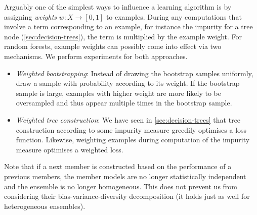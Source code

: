\documentclass[../main.tex]{subfiles}
\begin{document}
Arguably one of the simplest ways to influence a learning algorithm is by assigning \textit{weights} $w: X \to [0,1]$ to examples. During any computations that involve a term corresponding to an example, for instance the impurity for a tree node (\cf \ref{sec:decision-trees}), the term is multiplied by the example weight. 
For random forests, example weights can possibly come into effect via two mechanisms. We perform experiments for both approaches.
\begin{itemize}
    \item \textit{Weighted bootstrapping}: Instead of drawing the bootstrap samples uniformly, draw a sample with probability according to its weight. If the bootstrap sample is large, examples with higher weight are more likely to be oversampled and thus appear multiple times in the bootstrap sample. 
    \item \textit{Weighted tree construction}: We have seen in \ref{sec:decision-trees} that tree construction according to some impurity measure greedily optimises a loss function. Likewise, weighting examples during computation of the impurity measure optimises a weighted loss.
\end{itemize}

Note that if a next member is constructed based on the performance of a previous members, the member models are no longer statistically independent and the ensemble is no longer homogeneous. This does not prevent us from considering their bias-variance-diversity decomposition (it holds just as well for heterogeneous ensembles).


\end{document}
